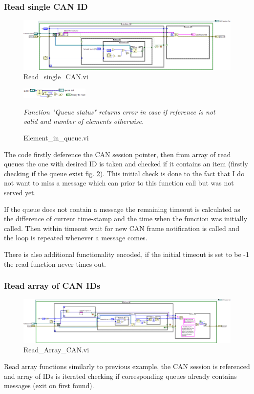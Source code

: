 \subsubsection{Read single CAN ID}
\begin{figure}[H]
    \centering
    \includegraphics[scale=\visc,max width=\textwidth]{figures/Read_single_CANd}
    \caption{Read\_single\_CAN.vi}
    \label{vi:Read_single_CAN}
\end{figure}
\begin{figure}
    \centering
    \includegraphics[scale=\visc,max width=0.3\textwidth]{figures/Element_in_queued}
    \caption{Element\_in\_queue.vi}
    \label{vi:Element_in_queue}
    \medskip
    \small
    \textit{Function "Queue status" returns error in case if reference is not valid and number of elements otherwise.}
    \vspace{-15pt}
\end{figure}
The code firstly deference the CAN session pointer, then from array of read queues the one with desired ID is taken and checked if it contains an item (firstly checking if the queue exist fig. \ref{vi:Element_in_queue}). This initial check is done to the fact that I do not want to miss a message which can prior to this function call but was not served yet.

If the queue does not contain a message the remaining timeout is calculated as the difference of current time-stamp and the time when the function was initially called. Then within timeout wait for new CAN frame notification is called and the loop is repeated whenever a message comes.

There is also additional functionality encoded, if the initial timeout is set to be -1 the read function never times out.

\subsubsection{Read array of CAN IDs}
\begin{figure}[H]
    \centering
    \includegraphics[scale=\visc,max width=\textwidth]{figures/Read_Array_CANd}
    \caption{Read\_Array\_CAN.vi}
    \label{vi:Read_Array_CAN}
\end{figure}
Read array functions similarly to previous example, the CAN session is referenced and array of IDs is iterated checking if corresponding queues already contains messages (exit on first found).

